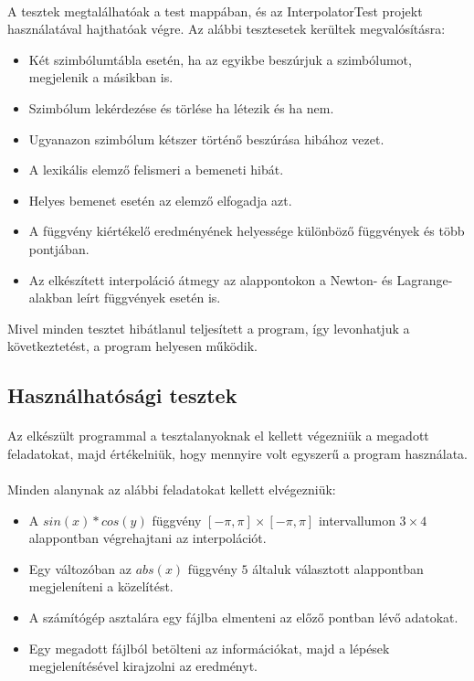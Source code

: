 \documentclass[12pt]{report}
\begin{document}
\paragraph{}
A tesztek megtalálhatóak a test mappában, és az InterpolatorTest projekt használatával hajthatóak végre. Az alábbi tesztesetek kerültek megvalósításra:
\begin{itemize}
\item Két szimbólumtábla esetén, ha az egyikbe beszúrjuk a szimbólumot, megjelenik a másikban is.
\item Szimbólum lekérdezése és törlése ha létezik és ha nem.
\item Ugyanazon szimbólum kétszer történő beszúrása hibához vezet.
\item A lexikális elemző felismeri a bemeneti hibát.
\item Helyes bemenet esetén az elemző elfogadja azt.
\item A függvény kiértékelő eredményének helyessége különböző függvények és több pontjában.
\item Az elkészített interpoláció átmegy az alappontokon a Newton- és Lagrange-alakban leírt függvények esetén is.
\end{itemize}
Mivel minden tesztet hibátlanul teljesített a program, így levonhatjuk a következtetést, a program helyesen működik.

\subsection{Használhatósági tesztek}
\paragraph{}
Az elkészült programmal a tesztalanyoknak el kellett végezniük a megadott feladatokat, majd értékelniük, hogy mennyire volt egyszerű a program használata.
\paragraph{}
Minden alanynak az alábbi feladatokat kellett elvégezniük:
\begin{itemize}
\item A $sin(x)*cos(y)$ függvény $[-\pi, \pi] \times [-\pi, \pi]$ intervallumon $3 \times 4$ alappontban végrehajtani az interpolációt.
\item Egy változóban az $abs(x)$ függvény $5$ általuk választott alappontban megjeleníteni a közelítést.
\item A számítógép asztalára egy fájlba elmenteni az előző pontban lévő adatokat.
\item Egy megadott fájlból betölteni az információkat, majd a lépések megjelenítésével kirajzolni az eredményt.
\end{itemize}
\end{document}
